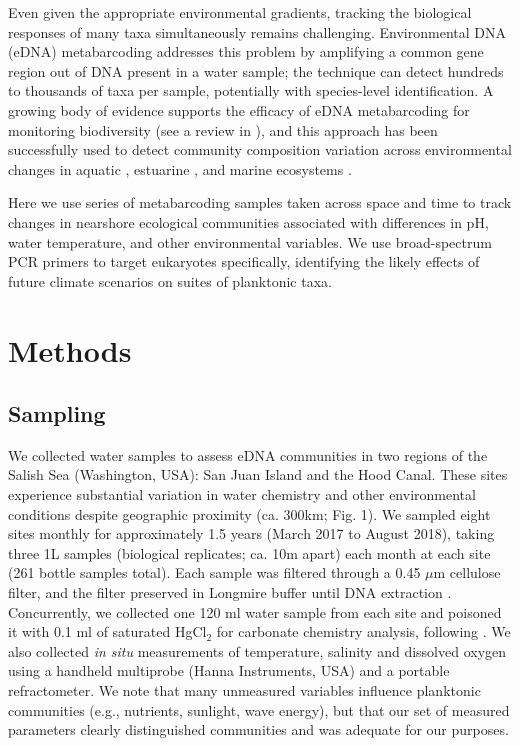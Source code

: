 \documentclass[11pt]{article}
\begin{document}
\begin{linenumbers}
Even given the appropriate environmental gradients, tracking the biological responses of many taxa simultaneously remains challenging. Environmental DNA (eDNA) metabarcoding \cite{holman2019detection, kelly2016genetic} addresses this problem by amplifying a common gene region out of DNA present in a water sample; the technique can detect hundreds to thousands of taxa per sample, potentially with species-level identification. A growing body of evidence supports the efficacy of eDNA metabarcoding for monitoring biodiversity (see a review in \cite{ruppert2019past}), and this approach has been successfully used to detect community composition variation across environmental changes in aquatic  \cite{emilson2017dna}, estuarine \cite{chariton2015metabarcoding, lallias2015environmental}, and marine ecosystems \cite{berry2019marine, djurhuus2019eDNA}.



Here we use series of metabarcoding samples taken across space and time to track changes in nearshore ecological communities associated with differences in pH, water temperature, and other environmental variables. We use broad-spectrum PCR primers \cite{leray_new_2013} to target eukaryotes specifically, identifying the likely effects of future climate scenarios on suites of planktonic taxa. 

%


\section{Methods}
\subsection*{Sampling}

We collected water samples to assess eDNA communities in two regions of the Salish Sea (Washington, USA): San Juan Island and the Hood Canal. These sites experience substantial variation in water chemistry and other environmental conditions despite geographic proximity (ca. 300km; Fig. 1). We sampled eight sites monthly for approximately 1.5 years (March 2017 to August 2018), taking three 1L samples (biological replicates; ca. 10m apart) each month at each site (261 bottle samples total). Each sample was filtered through a 0.45 $\mu$m  cellulose filter, and the filter preserved in Longmire buffer until DNA extraction \cite{renshaw2015room}. Concurrently, we collected one 120 ml water sample from each site and poisoned it with 0.1 ml of saturated HgCl$_2$ for carbonate chemistry analysis, following \cite{riebesell2011guide}. We also collected \textit{in situ} measurements of temperature, salinity and dissolved oxygen using a handheld multiprobe (Hanna Instruments, USA) and a portable refractometer. We note that many unmeasured variables influence planktonic communities (e.g., nutrients, sunlight, wave energy), but that our set of measured parameters clearly distinguished communities and was adequate for our purposes.
  

\end{linenumbers}
\end{document}
